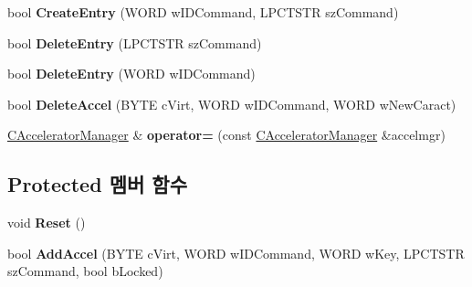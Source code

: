 \begin{DoxyCompactItemize}
\item 
\mbox{\label{class_c_accelerator_manager_ab534c2d8c0d7d7e30c5e907677bfad68}} 
bool {\bfseries Create\+Entry} (W\+O\+RD w\+I\+D\+Command, L\+P\+C\+T\+S\+TR sz\+Command)
\item 
\mbox{\label{class_c_accelerator_manager_ae20cd0e0259b70fe7443b442e85d1213}} 
bool {\bfseries Delete\+Entry} (L\+P\+C\+T\+S\+TR sz\+Command)
\item 
\mbox{\label{class_c_accelerator_manager_a25f2470050bd966a2f45235381dda32b}} 
bool {\bfseries Delete\+Entry} (W\+O\+RD w\+I\+D\+Command)
\item 
\mbox{\label{class_c_accelerator_manager_a73426e98a7fb4d8e5481a8e55a8a2626}} 
bool {\bfseries Delete\+Accel} (B\+Y\+TE c\+Virt, W\+O\+RD w\+I\+D\+Command, W\+O\+RD w\+New\+Caract)
\item 
\mbox{\label{class_c_accelerator_manager_a11c56cbcdfac0008ecb4aef10ba51ae8}} 
\mbox{\hyperlink{class_c_accelerator_manager}{C\+Accelerator\+Manager}} \& {\bfseries operator=} (const \mbox{\hyperlink{class_c_accelerator_manager}{C\+Accelerator\+Manager}} \&accelmgr)
\end{DoxyCompactItemize}
\subsection*{Protected 멤버 함수}
\begin{DoxyCompactItemize}
\item 
\mbox{\label{class_c_accelerator_manager_aca456cda1a5f9b17bcfaea4f8ff45903}} 
void {\bfseries Reset} ()
\item 
\mbox{\label{class_c_accelerator_manager_ac9e0e988625c9687666a9f582f9b3536}} 
bool {\bfseries Add\+Accel} (B\+Y\+TE c\+Virt, W\+O\+RD w\+I\+D\+Command, W\+O\+RD w\+Key, L\+P\+C\+T\+S\+TR sz\+Command, bool b\+Locked)
\end{DoxyCompactItemize}

